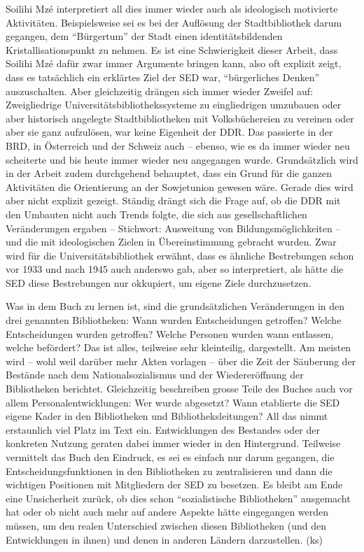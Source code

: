 \documentclass[a4paper,
fontsize=11pt,
oneside,
numbers=noperiodatend,
parskip=half-,
bibliography=totoc,
final
]{scrartcl}
\begin{document}
Soilihi Mzé interpretiert all dies immer wieder auch als ideologisch
motivierte Aktivitäten. Beispielsweise sei es bei der Auflösung der
Stadtbibliothek darum gegangen, dem ``Bürgertum'' der Stadt einen
identitätsbildenden Kristallisationspunkt zu nehmen. Es ist eine
Schwierigkeit dieser Arbeit, dass Soilihi Mzé dafür zwar immer Argumente
bringen kann, also oft explizit zeigt, dass es tatsächlich ein erklärtes
Ziel der SED war, ``bürgerliches Denken'' auszuschalten. Aber
gleichzeitig drängen sich immer wieder Zweifel auf: Zweigliedrige
Universitätsbibliothekssysteme zu eingliedrigen umzubauen oder aber
historisch angelegte Stadtbibliotheken mit Volksbüchereien zu vereinen
oder aber sie ganz aufzulösen, war keine Eigenheit der DDR. Das
passierte in der BRD, in Österreich und der Schweiz auch -- ebenso, wie
es da immer wieder neu scheiterte und bis heute immer wieder neu
angegangen wurde. Grundsätzlich wird in der Arbeit zudem durchgehend
behauptet, dass ein Grund für die ganzen Aktivitäten die Orientierung an
der Sowjetunion gewesen wäre. Gerade dies wird aber nicht explizit
gezeigt. Ständig drängt sich die Frage auf, ob die DDR mit den Umbauten
nicht auch Trends folgte, die sich aus gesellschaftlichen Veränderungen
ergaben -- Stichwort: Ausweitung von Bildungsmöglichkeiten -- und die
mit ideologischen Zielen in Übereinstimmung gebracht wurden. Zwar wird
für die Universitätsbibliothek erwähnt, dass es ähnliche Bestrebungen
schon vor 1933 und nach 1945 auch anderswo gab, aber so interpretiert,
als hätte die SED diese Bestrebungen nur okkupiert, um eigene Ziele
durchzusetzen.

Was in dem Buch zu lernen ist, sind die grundsätzlichen Veränderungen in
den drei genannten Bibliotheken: Wann wurden Entscheidungen getroffen?
Welche Entscheidungen wurden getroffen? Welche Personen wurden wann
entlassen, welche befördert? Das ist alles, teilweise sehr kleinteilig,
dargestellt. Am meisten wird -- wohl weil darüber mehr Akten vorlagen --
über die Zeit der Säuberung der Bestände nach dem Nationalsozialismus
und der Wiedereröffnung der Bibliotheken berichtet. Gleichzeitig
beschreiben grosse Teile des Buches auch vor allem
Personalentwicklungen: Wer wurde abgesetzt? Wann etablierte die SED
eigene Kader in den Bibliotheken und Bibliotheksleitungen? All das nimmt
erstaunlich viel Platz im Text ein. Entwicklungen des Bestandes oder der
konkreten Nutzung geraten dabei immer wieder in den Hintergrund.
Teilweise vermittelt das Buch den Eindruck, es sei es einfach nur darum
gegangen, die Entscheidungsfunktionen in den Bibliotheken zu
zentralisieren und dann die wichtigen Positionen mit Mitgliedern der SED
zu besetzen. Es bleibt am Ende eine Unsicherheit zurück, ob dies schon
``sozialistische Bibliotheken'' ausgemacht hat oder ob nicht auch mehr
auf andere Aspekte hätte eingegangen werden müssen, um den realen
Unterschied zwischen diesen Bibliotheken (und den Entwicklungen in
ihnen) und denen in anderen Ländern darzustellen. (ks)
\end{document}
